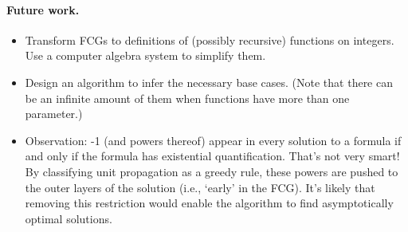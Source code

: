 \paragraph{Future work.}
\begin{itemize}
  \item Transform FCGs to definitions of (possibly recursive) functions on
        integers. Use a computer algebra system to simplify them.
  \item Design an algorithm to infer the necessary base cases. (Note that there
        can be an infinite amount of them when functions have more than one
        parameter.)
  \item Observation: -1 (and powers thereof) appear in every solution to a
        formula if and only if the formula has existential quantification.
        That's not very smart! By classifying unit propagation as a greedy rule,
        these powers are pushed to the outer layers of the solution (i.e.,
        `early' in the FCG). It's likely that removing this restriction would
        enable the algorithm to find asymptotically optimal solutions.
\end{itemize}
